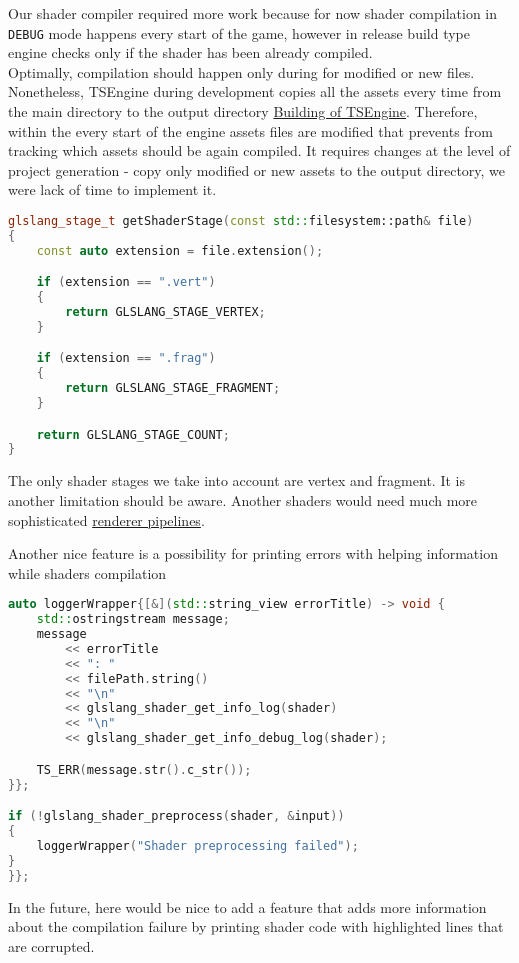 \label{problem_with_shader_compilation}
Our shader compiler required more work because for now shader compilation in \texttt{DEBUG} mode happens every start of the game, however in release build type engine checks only if the shader has been already compiled.\\
Optimally, compilation should happen only during for modified or new files. Nonetheless, TSEngine during development copies all the assets every time from the main directory to the output directory  \hyperref[lst:build]{Building of TSEngine}. Therefore, within the every start of the engine assets files are modified that prevents from tracking which assets should be again compiled. It requires changes at the level of project generation - copy only modified or new assets to the output directory, we were lack of time to implement it.

\begin{lstlisting}[language=c++, caption=Shader Compiler supported shader stages (./engine/src/vulkan\_tools/shaders\_compiler.cpp)]
glslang_stage_t getShaderStage(const std::filesystem::path& file)
{
    const auto extension = file.extension();

    if (extension == ".vert")
    {
        return GLSLANG_STAGE_VERTEX;
    }

    if (extension == ".frag")
    {
        return GLSLANG_STAGE_FRAGMENT;
    }

    return GLSLANG_STAGE_COUNT;
}
\end{lstlisting}
The only shader stages we take into account are vertex and fragment. It is another limitation should be aware. Another shaders would need much more sophisticated \hyperref[sec:renderer]{renderer pipelines}.

Another nice feature is a possibility for printing errors with helping information while shaders compilation
\begin{lstlisting}[language=c++, caption=Shader Compiler logging (./engine/src/vulkan\_tools/shaders\_compiler.cpp)]
auto loggerWrapper{[&](std::string_view errorTitle) -> void {
    std::ostringstream message;
    message
        << errorTitle
        << ": "
        << filePath.string()
        << "\n"
        << glslang_shader_get_info_log(shader)
        << "\n"
        << glslang_shader_get_info_debug_log(shader);

    TS_ERR(message.str().c_str());
}};

if (!glslang_shader_preprocess(shader, &input))
{
    loggerWrapper("Shader preprocessing failed");
}
}};
\end{lstlisting}
In the future, here would be nice to add a feature that adds more information about the compilation failure by printing shader code with highlighted lines that are corrupted. 

